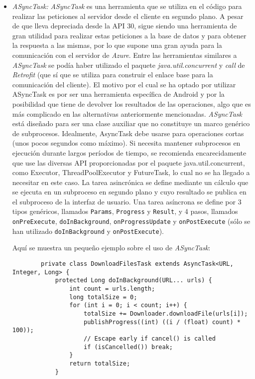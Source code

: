 \begin{itemize}
    \item \textit{ASyncTask: } \textit{ASyncTask} es una herramienta que se
    utiliza en el código para realizar las peticiones al servidor desde el
    cliente en segundo plano. A pesar de que lleva depreciada desde la API 30,
    sigue siendo una herramienta de gran utilidad para realizar estas peticiones
    a la base de datos y para obtener la respuesta a las mismas, por lo que
    supone una gran ayuda para la comunicación con el servidor de
    \textit{Azure}. Entre las herramientas similares a \textit{ASyncTask} se
    podía haber utilizado el paquete \textit{java.util.concurrent} y
    \textit{call} de \textit{Retrofit} (que sí que se utiliza para construir el
    enlace base para la comunicación del cliente). El motivo por el cual se ha
    optado por utilizar ASyncTask es por ser una herramienta específica de
    Android y por la posibilidad que tiene de devolver los resultados de las
    operaciones, algo que es más complicado en las alternativas anteriormente
    mencionadas. \textit{ASyncTask} está diseñado para ser una clase auxiliar
    que no constituye un marco genérico de subprocesos. Idealmente, AsyncTask
    debe usarse para operaciones cortas (unos pocos segundos como máximo). Si
    necesita mantener subprocesos en ejecución durante largos períodos de
    tiempo, se recomienda encarecidamente que use las diversas API
    proporcionadas por el paquete java.util.concurrent, como Executor,
    ThreadPoolExecutor y FutureTask, lo cual no se ha llegado a necesitar en
    este caso. La tarea asincrónica se define mediante un cálculo que se ejecuta
    en un subproceso en segundo plano y cuyo resultado se publica en el
    subproceso de la interfaz de usuario. Una tarea asíncrona se define por 3
    tipos genéricos, llamados \texttt{Params}, \texttt{Progress} y
    \texttt{Result}, y 4 pasos, llamados \texttt{onPreExecute},
    \texttt{doInBackground}, \texttt{onProgressUpdate} y \texttt{onPostExecute}
    (sólo se han utilizado \texttt{doInBackground} y \texttt{onPostExecute}). 

    Aquí se muestra un pequeño ejemplo sobre el uso de \textit{ASyncTask}:
    \begin{lstlisting}
        private class DownloadFilesTask extends AsyncTask<URL, Integer, Long> {
            protected Long doInBackground(URL... urls) {
                int count = urls.length;
                long totalSize = 0;
                for (int i = 0; i < count; i++) {
                    totalSize += Downloader.downloadFile(urls[i]);
                    publishProgress((int) ((i / (float) count) * 100));
                    // Escape early if cancel() is called
                    if (isCancelled()) break;
                }
                return totalSize;
            }


\end{lstlisting}
\end{itemize}

